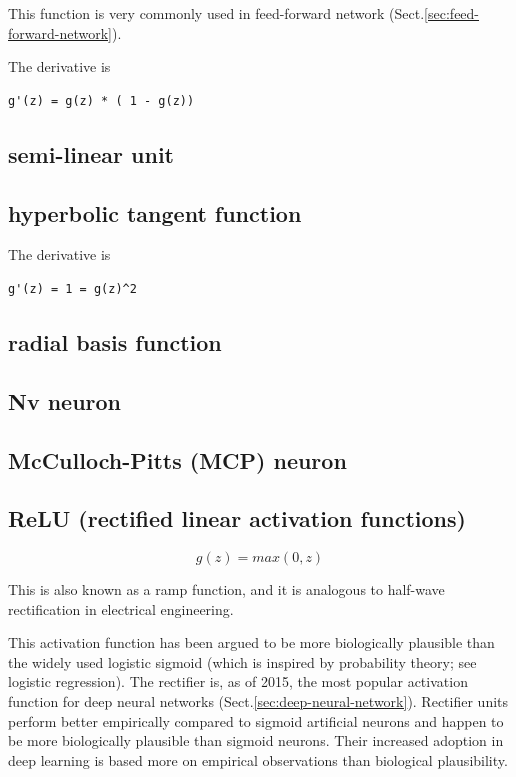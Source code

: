 This function is very commonly used in feed-forward network
(Sect.\ref{sec:feed-forward-network}).


The derivative is
\begin{verbatim}
g'(z) = g(z) * ( 1 - g(z))
\end{verbatim}

\subsection{semi-linear unit}
\label{sec:semi-linear-unit}


\subsection{hyperbolic tangent function}
\label{sec:hyperbolic-tangent-function}


The derivative is
\begin{verbatim}
g'(z) = 1 = g(z)^2
\end{verbatim}



\subsection{radial basis function}
\label{sec:radial-basis-function}



\subsection{Nv neuron}

\subsection{McCulloch-Pitts (MCP) neuron}


\subsection{ReLU (rectified linear activation functions)}
\label{sec:rectified-linear-activation-function}

\begin{equation}
g(z) = max(0, z)
\end{equation}

This is also known as a ramp function, and it is analogous to half-wave
rectification in electrical engineering. 

This activation function has been argued to be more biologically plausible than
the widely used logistic sigmoid (which is inspired by probability theory; see
logistic regression). The rectifier is, as of 2015, the most popular activation
function for deep neural networks (Sect.\ref{sec:deep-neural-network}).
Rectifier units perform better empirically compared to sigmoid artificial
neurons and happen to be more biologically plausible than sigmoid neurons. Their
increased adoption in deep learning is based more on empirical observations than
biological plausibility.

